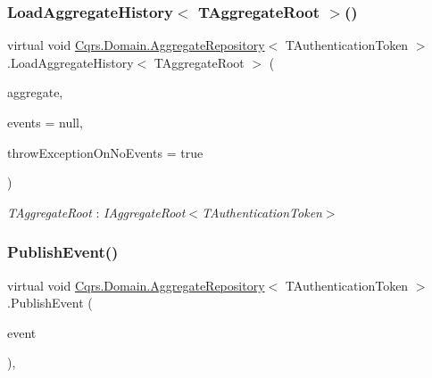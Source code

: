 \subsubsection{\texorpdfstring{Load\+Aggregate\+History$<$ T\+Aggregate\+Root $>$()}{LoadAggregateHistory< TAggregateRoot >()}}
{\footnotesize\ttfamily virtual void \hyperlink{classCqrs_1_1Domain_1_1AggregateRepository}{Cqrs.\+Domain.\+Aggregate\+Repository}$<$ T\+Authentication\+Token $>$.Load\+Aggregate\+History$<$ T\+Aggregate\+Root $>$ (\begin{DoxyParamCaption}\item[{T\+Aggregate\+Root}]{aggregate,  }\item[{I\+List$<$ \hyperlink{interfaceCqrs_1_1Events_1_1IEvent}{I\+Event}$<$ T\+Authentication\+Token $>$$>$}]{events = {\ttfamily null},  }\item[{bool}]{throw\+Exception\+On\+No\+Events = {\ttfamily true} }\end{DoxyParamCaption})\hspace{0.3cm}{\ttfamily [virtual]}}

\begin{Desc}
\item[Type Constraints]\begin{description}
\item[{\em T\+Aggregate\+Root} : {\em I\+Aggregate\+Root$<$T\+Authentication\+Token$>$}]\end{description}
\end{Desc}
\mbox{\label{classCqrs_1_1Domain_1_1AggregateRepository_a3191ba3d6fa4f6b904128c4731262944}} 
\subsubsection{\texorpdfstring{Publish\+Event()}{PublishEvent()}}
{\footnotesize\ttfamily virtual void \hyperlink{classCqrs_1_1Domain_1_1AggregateRepository}{Cqrs.\+Domain.\+Aggregate\+Repository}$<$ T\+Authentication\+Token $>$.Publish\+Event (\begin{DoxyParamCaption}\item[{\hyperlink{interfaceCqrs_1_1Events_1_1IEvent}{I\+Event}$<$ T\+Authentication\+Token $>$ @}]{event }\end{DoxyParamCaption})\hspace{0.3cm}{\ttfamily [protected]}, {\ttfamily [virtual]}}



